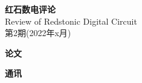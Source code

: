 \documentclass[UTF8,12pt,punct=kaiming,fontset=none]{ctexart}
\begin{document}
\thispagestyle{empty}
\BgThispage
\quad
\newpage

\quad
\vspace{-0.3cm}
\begin{center}
    \fontsize{46pt}{54.2pt} \textbf{红石数电评论} \\
    \Large Review of Redstonic Digital Circuit \\
    \Large 第2期(2022年x月)
\end{center}

\makeatletter
\newcommand{\cdotfill}{\leavevmode\cleaders\hb@xt@ 0.56cm{\hss\ensuremath{\cdots}\hss }\hfill\kern\z@}
\makeatother
{}
\setcounter{currentPageNumber}{3}
\newcommand{\addContent}{
    \setcounter{nextPageNumber}{\arabic{currentPageNumber}}
    \ifthenelse{\pageNumber>1}{
        \addtocounter{nextPageNumber}{\pageNumber}
        \addtocounter{nextPageNumber}{-1}
        \fileName\cdotfill\authorName\quad\arabic{currentPageNumber} - \arabic{nextPageNumber}
    }{
        \fileName\cdotfill\authorName\quad\arabic{currentPageNumber}
    }
    \addtocounter{currentPageNumber}{\pageNumber}

}

\begin{spacing}{1.8}

\large\sffamily\bfseries 论文

\normalsize\normalfont


\large\sffamily\bfseries 通讯

\normalsize\normalfont


\end{spacing}

\vspace{0.5cm}
\end{document}
